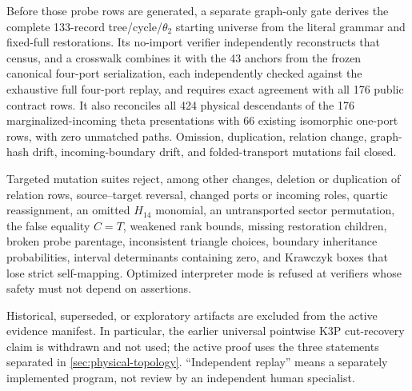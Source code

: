 Before those probe rows are generated, a separate graph-only gate derives the
complete 133-record tree/cycle/\(\theta_2\) starting universe from the literal
grammar and fixed-full restorations.  Its no-import verifier independently
reconstructs that census, and a crosswalk combines it with the 43 anchors from
the frozen canonical four-port serialization, each independently checked
against the exhaustive full four-port replay, and requires exact agreement
with all 176 public contract rows.  It also reconciles all 424 physical descendants of the 176
marginalized-incoming theta presentations with 66 existing isomorphic
one-port rows, with zero unmatched paths.  Omission, duplication, relation
change, graph-hash drift, incoming-boundary drift, and folded-transport
mutations fail closed.

Targeted mutation suites reject, among other changes, deletion or duplication
of relation rows, source--target reversal, changed ports or incoming roles,
quartic reassignment, an omitted \(H_{14}\) monomial, an untransported sector
permutation, the false equality \(C=T\), weakened rank bounds, missing
restoration children, broken probe parentage, inconsistent triangle choices,
boundary inheritance probabilities, interval determinants containing zero,
and Krawczyk boxes that lose strict self-mapping.  Optimized interpreter mode
is refused at verifiers whose safety must not depend on assertions.

Historical, superseded, or exploratory artifacts are excluded from the
active evidence manifest.  In particular, the earlier universal pointwise
K3P cut-recovery claim is withdrawn and not used; the active proof uses the
three statements separated in \cref{sec:physical-topology}.  ``Independent
replay'' means a separately implemented program, not review by an independent
human specialist.
